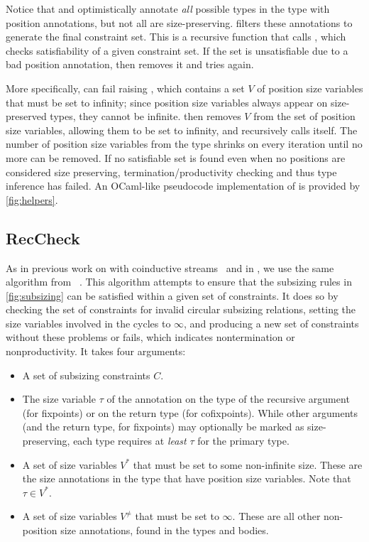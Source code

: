 

Notice that \setrecstars and \setcorecstars optimistically annotate \textit{all} possible \coinductive types in the \cofixpoint type with position annotations, but not all \cofixpoints are size-preserving.
\RecCheckLoop filters these annotations to generate the final constraint set.
This is a recursive function that calls \RecCheck, which checks satisfiability of a given constraint set.
If the set is unsatisfiable due to a bad position annotation, then \RecCheckLoop removes it and tries again.

More specifically, \RecCheck can fail raising \RecCheckFail, which contains a set $V$ of position size variables that must be set to infinity; since position size variables always appear on size-preserved types, they cannot be infinite.
\RecCheckLoop then removes $V$ from the set of position size variables, allowing them to be set to infinity, and recursively calls itself.
The number of position size variables from the \cofixpoint type shrinks on every iteration until no more can be removed.
If no satisfiable set is found even when no positions are considered size preserving, termination/productivity checking and thus type inference has failed.
An OCaml-like pseudocode implementation of \RecCheckLoop is provided by \autoref{fig:helpers}.

\subsection{RecCheck}

As in previous work on \CChatomega with coinductive streams~\citep{cc-hat-omega} and in \CIChat, we use the same \RecCheck algorithm from \Fhat~\citep{f-hat}.
This algorithm attempts to ensure that the subsizing rules in \autoref{fig:subsizing} can be satisfied within a given set of constraints.
It does so by checking the set of constraints for invalid circular subsizing relations, setting the size variables involved in the cycles to $\infty$, and producing a new set of constraints without these problems or fails, which indicates nontermination or nonproductivity.
It takes four arguments:

\begin{itemize}
  \item A set of subsizing constraints $C$.
  \item The size variable $\tau$ of the annotation on the type of the recursive argument (for fixpoints) or on the return type (for cofixpoints). While other arguments (and the return type, for fixpoints) may optionally be marked as size-preserving, each \cofixpoint type requires at \textit{least} $\tau$ for the primary \corecursive type.
  \item A set of size variables $V^*$ that must be set to some non-infinite size.
    These are the size annotations in the \cofixpoint type that have position size variables.
    Note that $\tau \in V^*$.
  \item A set of size variables $V^\neq$ that must be set to $\infty$.
    These are all other non-position size annotations, found in the \cofixpoint types and bodies.
\end{itemize}

